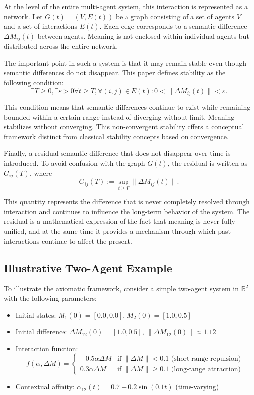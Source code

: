 \documentclass[11pt,a4paper]{article}
\theoremstyle{definition}
\begin{document}
At the level of the entire multi-agent system, this interaction is represented as a network. Let $G(t) = (V, E(t))$ be a graph consisting of a set of agents $V$ and a set of interactions $E(t)$. Each edge corresponds to a semantic difference $\Delta M_{ij}(t)$ between agents. Meaning is not enclosed within individual agents but distributed across the entire network.

The important point in such a system is that it may remain stable even though semantic differences do not disappear. This paper defines stability as the following condition:
\[
\exists T \geq 0, \exists \varepsilon > 0 \forall t \geq T, \forall (i,j) \in E(t) : 0 < \|\Delta M_{ij}(t)\| < \varepsilon.
\]

This condition means that semantic differences continue to exist while remaining bounded within a certain range instead of diverging without limit. Meaning stabilizes without converging. This non-convergent stability offers a conceptual framework distinct from classical stability concepts based on convergence.

Finally, a residual semantic difference that does not disappear over time is introduced. To avoid confusion with the graph $G(t)$, the residual is written as $G_{ij}(T)$, where
\[
G_{ij}(T) := \sup_{t \geq T} \|\Delta M_{ij}(t)\|.
\]

This quantity represents the difference that is never completely resolved through interaction and continues to influence the long-term behavior of the system. The residual is a mathematical expression of the fact that meaning is never fully unified, and at the same time it provides a mechanism through which past interactions continue to affect the present.

\subsection{Illustrative Two-Agent Example}

To illustrate the axiomatic framework, consider a simple two-agent system in $\mathbb{R}^2$ with the following parameters:

\begin{itemize}
\item Initial states: $M_1(0) = [0.0, 0.0]$, $M_2(0) = [1.0, 0.5]$
\item Initial difference: $\Delta M_{12}(0) = [1.0, 0.5]$, $\|\Delta M_{12}(0)\| \approx 1.12$
\item Interaction function:
\[
f(\alpha, \Delta M) = \begin{cases}
-0.5 \alpha \Delta M & \text{if } \|\Delta M\| < 0.1 \text{ (short-range repulsion)} \\
0.3 \alpha \Delta M & \text{if } \|\Delta M\| \geq 0.1 \text{ (long-range attraction)}
\end{cases}
\]
\item Contextual affinity: $\alpha_{12}(t) = 0.7 + 0.2\sin(0.1t)$ (time-varying)
\end{itemize}
\end{document}

